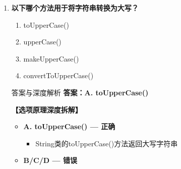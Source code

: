 \documentclass[12pt, a4paper]{ctexart}
\begin{document}
\begin{enumerate}[label=\textbf{\arabic*.}]
\begin{bluebox}{答案与深度解析}
\begin{itemize}[label={}, leftmargin=*, nosep]
\begin{itemize}[label={}, nosep]
					  \end{itemize}
		      \item \textbf{C. count() — 错误}
					  \begin{itemize}[label={}, nosep]
		      
			      \item 不是String的方法
		      

					  \end{itemize}
		      \item \textbf{D. getLength() — 错误}
					  \begin{itemize}[label={}, nosep]
		      
			      \item 不是String的标准方法
		      
		      

	      
					  \end{itemize}
					  \end{itemize}
\end{bluebox}

	      \vspace{1em}

	\item \textbf{以下哪个方法用于将字符串转换为大写？}
	      \begin{enumerate}[label=\Alph*.]
		      \item toUpperCase()
		      \item upperCase()
		      \item makeUpperCase()
		      \item convertToUpperCase()
	      \end{enumerate}

	      \begin{bluebox}{答案与深度解析}
		      \textbf{答案：A. toUpperCase()}

		      \textbf{【选项原理深度拆解】}
					  \begin{itemize}[label={}, leftmargin=*, nosep]


		      \item \textbf{A. toUpperCase() — 正确}
					  \begin{itemize}[label={}, nosep]
		      
			      \item String类的toUpperCase()方法返回大写字符串

					  \end{itemize}
		      \item \textbf{B/C/D — 错误}
					  \begin{itemize}[label={}, nosep]
		      

\end{itemize}
\end{itemize}
\end{bluebox}
\end{enumerate}
\end{document}
